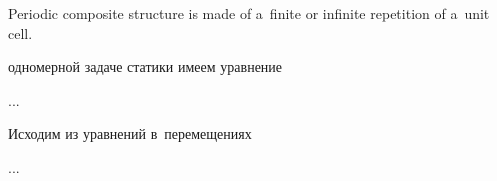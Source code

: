 

\thispagestyle{empty}

\label{chapter:periodiccomposites}

\begin{changemargin}{\parindent}{\parindent}
\vspace{-2.5em}
{\noindent\small

Periodic composite structure is made of a~finite or infinite repetition of a~unit cell.

\par}
\vspace{-1.4em}
\end{changemargin}



\begin{otherlanguage}{russian}

 одномерной задаче статики имеем уравнение

...



\end{otherlanguage}



\begin{otherlanguage}{russian}

Исходим из уравнений в~перемещениях

...



\end{otherlanguage}

